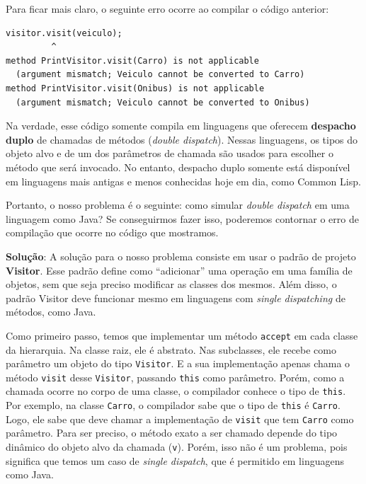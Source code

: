 \documentclass[
  11pt,
  twoside]{book}
\newcommand{\passthrough}[1]{#1}
\begin{document}
Para ficar mais claro, o seguinte erro ocorre ao compilar o código
anterior:

\newpage

\begin{lstlisting}
visitor.visit(veiculo);  
         ^
method PrintVisitor.visit(Carro) is not applicable
  (argument mismatch; Veiculo cannot be converted to Carro)
method PrintVisitor.visit(Onibus) is not applicable
  (argument mismatch; Veiculo cannot be converted to Onibus)
\end{lstlisting}

   Na
verdade, esse código somente compila em linguagens que oferecem
\textbf{despacho duplo} de chamadas de métodos (\emph{double dispatch}).
Nessas linguagens, os tipos do objeto alvo e de um dos parâmetros de
chamada são usados para escolher o método que será invocado. No entanto,
despacho duplo somente está disponível em linguagens mais antigas e
menos conhecidas hoje em dia, como Common Lisp.

Portanto, o nosso problema é o seguinte: como simular \emph{double
dispatch} em uma linguagem como Java? Se conseguirmos fazer isso,
poderemos contornar o erro de compilação que ocorre no código que
mostramos.

\textbf{Solução}: A solução para o nosso problema consiste em usar o
padrão de projeto \textbf{Visitor}. Esse padrão define como
``adicionar'' uma operação em uma família de objetos, sem que seja
preciso modificar as classes dos mesmos. Além disso, o padrão Visitor
deve funcionar mesmo em linguagens com \emph{single dispatching} de
métodos, como Java.

 Como primeiro passo, temos que implementar um
método \passthrough{\lstinline!accept!} em cada classe da hierarquia. Na
classe raiz, ele é abstrato. Nas subclasses, ele recebe como parâmetro
um objeto do tipo \passthrough{\lstinline!Visitor!}. E a sua
implementação apenas chama o método \passthrough{\lstinline!visit!}
desse \passthrough{\lstinline!Visitor!}, passando
\passthrough{\lstinline!this!} como parâmetro. Porém, como a chamada
ocorre no corpo de uma classe, o compilador conhece o tipo de
\passthrough{\lstinline!this!}. Por exemplo, na classe
\passthrough{\lstinline!Carro!}, o compilador sabe que o tipo de
\passthrough{\lstinline!this!} é \passthrough{\lstinline!Carro!}. Logo,
ele sabe que deve chamar a implementação de
\passthrough{\lstinline!visit!} que tem \passthrough{\lstinline!Carro!}
como parâmetro. Para ser preciso, o método exato a ser chamado depende
do tipo dinâmico do objeto alvo da chamada
(\passthrough{\lstinline!v!}). Porém, isso não é um problema, pois
significa que temos um caso de \emph{single dispatch}, que é permitido
em linguagens como Java.
\end{document}

